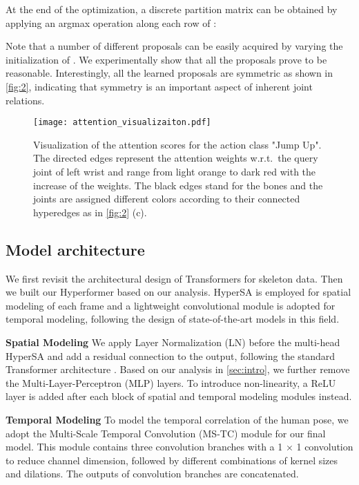 \documentclass[10pt,twocolumn,letterpaper]{article}
\begin{document}
At the end of the optimization, a discrete partition matrix can be obtained by applying an argmax operation along each row of :

Note that a number of different proposals can be easily acquired by varying the initialization of . We experimentally show that all the proposals prove to be reasonable. Interestingly, all the learned proposals are symmetric as shown in \cref{fig:2}, indicating that symmetry is an important aspect of inherent joint relations. 

\begin{figure*}[ht]
  \centering
      \texttt{[image: attention\_visualizaiton.pdf]}
     \caption{Visualization of the attention scores for the action class "Jump Up". The directed edges represent the attention weights w.r.t.~the query joint of left wrist and range from light orange to dark red with the increase of the weights. The black edges stand for the bones and the joints are assigned different colors according to their connected hyperedges as in \cref{fig:2} (c). }
     \label{fig:attention}
\end{figure*}

\subsection{Model architecture}

We first revisit the architectural design of Transformers for skeleton data.
Then we built our Hyperformer based on our analysis. HyperSA is employed for spatial modeling of each frame and a lightweight convolutional module is adopted for temporal modeling, following the design of state-of-the-art models \cite{chi2022infogcn, chen2021channel} in this field. 



\noindent \textbf{Spatial Modeling}
We apply Layer Normalization (LN) before the multi-head HyperSA and add a residual connection to the output, following the standard Transformer architecture \cite{vaswani2017attention}.
Based on our analysis in \cref{sec:intro}, we further remove the Multi-Layer-Perceptron (MLP) layers. To introduce non-linearity, a ReLU layer is added after each block of spatial and temporal modeling modules instead.



\noindent \textbf{Temporal Modeling}
To model the temporal correlation of
the human pose, we adopt the Multi-Scale Temporal Convolution (MS-TC) module \cite{chen2021channel, liu2020disentangling, chi2022infogcn} for our final model. This module contains three convolution branches with a 1 × 1 convolution to reduce channel dimension, followed by different combinations of kernel sizes
and dilations. The outputs of convolution branches are
concatenated.
\end{document}
